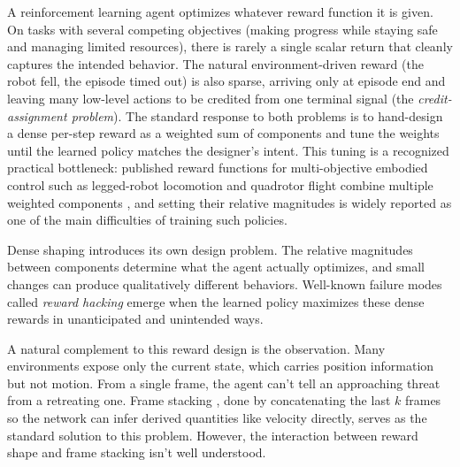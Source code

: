 \documentclass[12pt,a4paper,titlepage]{article}
\begin{document}
A reinforcement learning agent optimizes whatever reward function it is given. On tasks with several competing objectives (making progress while staying safe and managing limited resources), there is rarely a single scalar return that cleanly captures the intended behavior. The natural environment-driven reward (the robot fell, the episode timed out) is also sparse, arriving only at episode end and leaving many low-level actions to be credited from one terminal signal (the \emph{credit-assignment problem}). The standard response to both problems is to hand-design a dense per-step reward as a weighted sum of components and tune the weights until the learned policy matches the designer's intent. This tuning is a recognized practical bottleneck: published reward functions for multi-objective embodied control such as legged-robot locomotion and quadrotor flight combine multiple weighted components \citep{Hwangbo2019, Hwangbo2017}, and setting their relative magnitudes is widely reported as one of the main difficulties of training such policies.

Dense shaping introduces its own design problem. The relative magnitudes between components determine what the agent actually optimizes, and small changes can produce qualitatively different behaviors. Well-known failure modes called \emph{reward hacking} \citep{Amodei2016} emerge when the learned policy maximizes these dense rewards in unanticipated and unintended ways.

A natural complement to this reward design is the observation. Many environments expose only the current state, which carries position information but not motion. From a single frame, the agent can't tell an approaching threat from a retreating one. Frame stacking \citep{Mnih2015}, done by concatenating the last $k$ frames so the network can infer derived quantities like velocity directly, serves as the standard solution to this problem. However, the interaction between reward shape and frame stacking isn't well understood.
\end{document}
